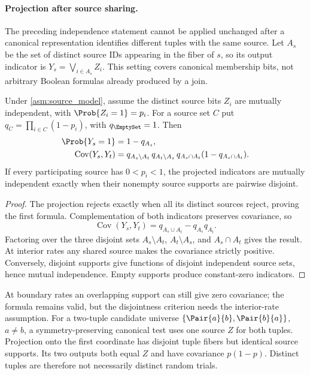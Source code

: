 \documentclass[ ../main.tex]{subfiles}
\begin{document}
\paragraph{Projection after source sharing.}
The preceding independence statement cannot be applied unchanged after a
canonical representation identifies different tuples with the same source.
Let $A_s$ be the set of distinct source IDs appearing in the fiber of $s$,
so its output indicator is $Y_s=\bigvee_{i\in A_s}Z_i$. This setting covers
canonical membership bits, not arbitrary Boolean formulas already produced by
a join.

\begin{theorem}
\label{thm:project_sources}
Under \cref{asm:source_model}, assume the distinct source bits $Z_i$ are
mutually independent, with $\Prob{Z_i=1}=p_i$. For a source set $C$ put
$q_C=\prod_{i\in C}(1-p_i)$, with $q_{\EmptySet}=1$. Then
\begin{align}
 \Prob{Y_s=1}&=1-q_{A_s},\\
 \operatorname{Cov}(Y_s,Y_t)
 &=q_{A_s\setminus A_t}\,q_{A_t\setminus A_s}\,
   q_{A_s\cap A_t}(1-q_{A_s\cap A_t}).
\end{align}
If every participating source has $0<p_i<1$, the projected indicators are
mutually independent exactly when their nonempty source supports are pairwise
disjoint.
\end{theorem}
\begin{proof}
The projection rejects exactly when all its distinct sources reject, proving
the first formula. Complementation of both indicators preserves covariance, so
\begin{equation}
 \operatorname{Cov}(Y_s,Y_t)=q_{A_s\cup A_t}-q_{A_s}q_{A_t}.
\end{equation}
Factoring over the three disjoint sets $A_s\setminus A_t$,
$A_t\setminus A_s$, and $A_s\cap A_t$ gives the result. At interior rates
any shared source makes the covariance strictly positive. Conversely, disjoint
supports give functions of disjoint independent source sets, hence mutual
independence. Empty supports produce constant-zero indicators.
\end{proof}

At boundary rates an overlapping support can still give zero covariance; the
formula remains valid, but the disjointness criterion needs the interior-rate
assumption. For a two-tuple candidate universe
$\{\Pair{a}{b},\Pair{b}{a}\}$, $a\ne b$, a symmetry-preserving canonical test
uses one source $Z$ for both tuples. Projection onto the first coordinate has
disjoint tuple fibers but identical source supports. Its two outputs both
equal $Z$ and have covariance $p(1-p)$. Distinct tuples are therefore not
necessarily distinct random trials.
\end{document}
